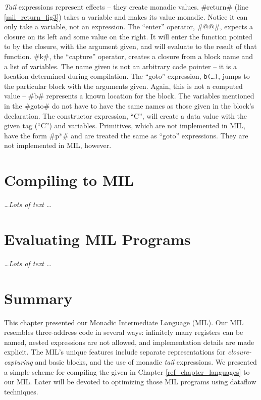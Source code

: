 \documentclass[12pt]{report}
\begin{document}
\emph{Tail} expressions represent effects -- they create monadic
values. #return# (line \ref{mil_return_fig3}) takes a variable and
makes its value monadic. Notice it can only take a variable, not an
expression.  The ``enter'' operator, #@@#, expects a closure on its
left and some value on the right. It will enter the function pointed
to by the closure, with the argument given, and will evaluate to the
result of that function. #k#, the ``capture'' operator, creates a
closure from a block name and a list of variables. The name given is
not an arbitrary code pointer -- it is a location determined during
compilation. The ``goto'' expression, \texttt{b(\dots)}, jumps to the
particular block with the arguments given. Again, this is not a
computed value -- #b# represents a known location for the block. The
variables mentioned in the #goto# do not have to have the same names
as those given in the block's declaration. The constructor expression,
``C'', will create a data value with the given tag (``C'') and
variables. Primitives, which are not implemented in MIL, have the form
#p*# and are treated the same as ``goto'' expressions. They are not 
implemented in MIL, however. 

\section{Compiling \lamA to MIL}
\label{mil_sec4}

\emph{\dots Lots of text \dots}

\section{Evaluating MIL Programs}
\label{mil_sec5}

\emph{\dots Lots of text \dots}



\section{Summary}
\label{mil_sec6}

This chapter presented our Monadic Intermediate Language (MIL). Our
MIL resembles three-address code in several ways: infinitely many
registers can be named, nested expressions are not allowed, and
implementation details are made explicit. The MIL's unique features
include separate representations for \emph{closure-capturing} and
basic blocks, and the use of monadic \emph{tail} expressions. We 
presented a simple scheme for compiling the \lamA given in
Chapter \ref{ref_chapter_languages} to our MIL. Later will be devoted
to optimizing those MIL programs using dataflow techniques.
\end{document}
